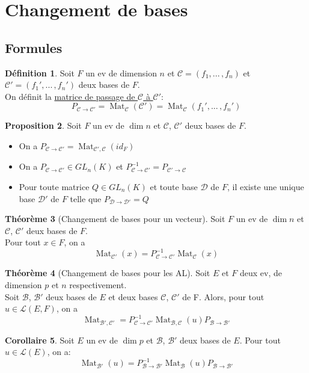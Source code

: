 \documentclass[10pt,a4paper]{article}
\theoremstyle{definition}
\newtheorem{proposition}{Proposition}[section]
\newtheorem{theorem}[proposition]{Théorème}
\newtheorem{corollaire}[proposition]{Corollaire}
\newtheorem{definition}[proposition]{Définition}
\DeclareMathOperator{\Mat}{Mat}
\begin{document}
\section{Changement de bases}
\subsection{Formules}
\begin{definition}
Soit $F$ un ev de dimension $n$ et $\mathcal{C} = (f_1, ...\, , f_n)$ et $\mathcal{C}' = (f_1', ...\, , f_n')$ deux bases de $F$. \\
On définit la \uline{matrice de passage de $\mathcal{C}$ à $\mathcal{C}'$}:
\[P_{\mathcal{C} \to \mathcal{C}'} = \Mat_\mathcal{C}(\mathcal{C}') = \Mat_\mathcal{C}(f_1', ...\, , f_n')\]
\end{definition}
\begin{proposition}
Soit $F$ un ev de $\dim n$ et $\mathcal{C}$, $\mathcal{C}'$ deux bases de $F$.
\begin{itemize}
\item On a $P_{\mathcal{C} \to \mathcal{C}'} = \Mat_{\mathcal{C}', \mathcal{C}}(id_F)$
\item On a $P_{\mathcal{C} \to \mathcal{C}'} \in GL_n(K)$ et $P_{\mathcal{C} \to \mathcal{C}'}^{-1} = P_{\mathcal{C}' \to \mathcal{C}}$
\item Pour toute matrice $Q \in GL_n(K)$ et toute base $\mathcal{D}$ de $F$, il existe une unique base $\mathcal{D}'$ de $F$ telle que $P_{\mathcal{D} \to \mathcal{D}'} = Q$
\end{itemize}
\end{proposition}
\begin{theorem}[Changement de bases pour un vecteur]
Soit $F$ un ev de $\dim n$ et $\mathcal{C}$, $\mathcal{C}'$ deux bases de $F$. \\
Pour tout $x \in F$, on a
\[\Mat_{\mathcal{C}'}(x) = P_{\mathcal{C} \to \mathcal{C}'}^{-1} \Mat_\mathcal{C}(x)\]
\end{theorem}
\begin{theorem}[Changement de bases pour les AL]
Soit $E$ et $F$ deux ev, de dimension $p$ et $n$ respectivement. \\
Soit $\mathcal{B}$, $\mathcal{B}'$ deux bases de $E$ et deux bases $\mathcal{C}$, $\mathcal{C}'$ de F. Alors, pour tout $u \in \mathcal{L}(E, F)$, on a
\[\Mat_{\mathcal{B}', \mathcal{C}'} = P_{\mathcal{C} \to \mathcal{C}'}^{-1} \Mat_{\mathcal{B}, \mathcal{C}}(u) P_{\mathcal{B} \to \mathcal{B}'}\]
\end{theorem}
\begin{corollaire}
Soit $E$ un ev de $\dim p$ et $\mathcal{B}$, $\mathcal{B}'$ deux bases de $E$. Pour tout $u \in \mathcal{L}(E)$, on a:
\[\Mat_{\mathcal{B}'}(u) = P_{\mathcal{B} \to \mathcal{B}'}^{-1} \Mat_\mathcal{B}(u) P_{\mathcal{B} \to \mathcal{B}'}\]
\end{corollaire}
\end{document}
